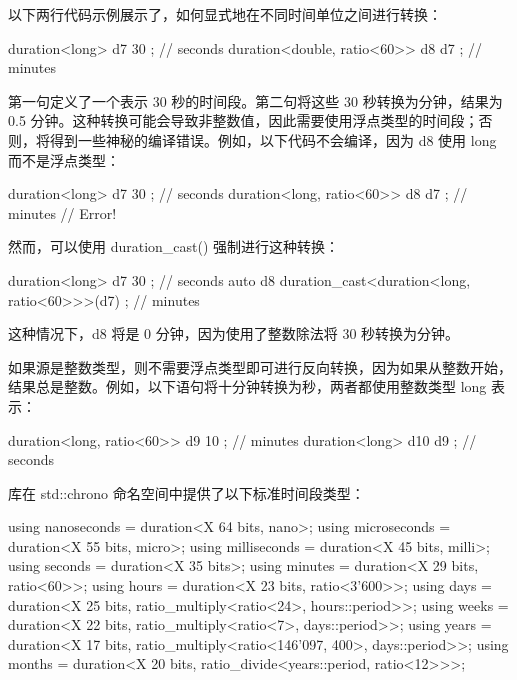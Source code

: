 以下两行代码示例展示了，如何显式地在不同时间单位之间进行转换：

\begin{cpp}
duration<long> d7 { 30 }; // seconds
duration<double, ratio<60>> d8 { d7 }; // minutes
\end{cpp}

第一句定义了一个表示 30 秒的时间段。第二句将这些 30 秒转换为分钟，结果为 0.5 分钟。这种转换可能会导致非整数值，因此需要使用浮点类型的时间段；否则，将得到一些神秘的编译错误。例如，以下代码不会编译，因为 d8 使用 long 而不是浮点类型：

\begin{cpp}
duration<long> d7 { 30 }; // seconds
duration<long, ratio<60>> d8 { d7 }; // minutes // Error!
\end{cpp}

然而，可以使用 duration\_cast() 强制进行这种转换：

\begin{cpp}
duration<long> d7 { 30 }; // seconds
auto d8 { duration_cast<duration<long, ratio<60>>>(d7) }; // minutes
\end{cpp}

这种情况下，d8 将是 0 分钟，因为使用了整数除法将 30 秒转换为分钟。

如果源是整数类型，则不需要浮点类型即可进行反向转换，因为如果从整数开始，结果总是整数。例如，以下语句将十分钟转换为秒，两者都使用整数类型 long 表示：

\begin{cpp}
duration<long, ratio<60>> d9 { 10 }; // minutes
duration<long> d10 { d9 }; // seconds
\end{cpp}


库在 std::chrono 命名空间中提供了以下标准时间段类型：

\begin{cpp}
using nanoseconds = duration<X 64 bits, nano>;
using microseconds = duration<X 55 bits, micro>;
using milliseconds = duration<X 45 bits, milli>;
using seconds = duration<X 35 bits>;
using minutes = duration<X 29 bits, ratio<60>>;
using hours = duration<X 23 bits, ratio<3'600>>;
using days = duration<X 25 bits, ratio_multiply<ratio<24>, hours::period>>;
using weeks = duration<X 22 bits, ratio_multiply<ratio<7>, days::period>>;
using years = duration<X 17 bits,
              ratio_multiply<ratio<146'097, 400>, days::period>>;
using months = duration<X 20 bits, ratio_divide<years::period, ratio<12>>>;
\end{cpp}

